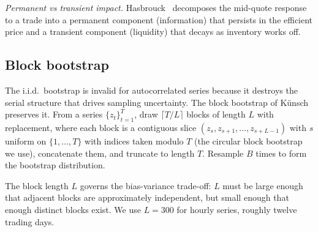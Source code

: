 \documentclass[11pt]{article}
\begin{document}
\emph{Permanent vs transient impact.} Hasbrouck~\cite{hasbrouck1991measuring} decomposes
the mid-quote response to a trade into a permanent component (information) that persists in
the efficient price and a transient component (liquidity) that decays as inventory works
off.

\subsection{Block bootstrap}
\label{app:bb}

The i.i.d.~bootstrap is invalid for autocorrelated series because it destroys the serial
structure that drives sampling uncertainty. The block bootstrap of
K\"unsch~\cite{kunsch1989block} preserves it. From a series $\{z_t\}_{t=1}^{T}$, draw
$\lceil T / L \rceil$ blocks of length $L$ with replacement, where each block is a
contiguous slice $(z_s, z_{s+1}, \dots, z_{s+L-1})$ with $s$ uniform on
$\{1, \dots, T\}$ with indices taken modulo $T$ (the circular block bootstrap we use), concatenate them, and truncate to length $T$. Resample $B$ times
to form the bootstrap distribution.

The block length $L$ governs the bias-variance trade-off: $L$ must be large enough that
adjacent blocks are approximately independent, but small enough that enough distinct blocks
exist. We use $L = 300$ for hourly series, roughly twelve trading days.
\end{document}
